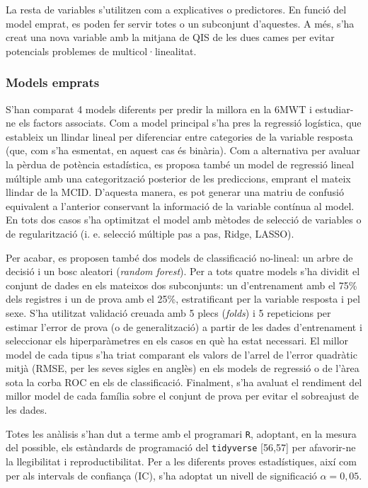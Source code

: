 \documentclass[CAT]{TFUOC}%
\begin{document}
La resta de variables s'utilitzen com a explicatives o predictores. En funció del model emprat, es poden fer servir totes o un subconjunt d'aquestes. A més, s'ha creat una nova variable amb la mitjana de QIS de les dues cames per evitar potencials problemes de multicol·linealitat.

\subsubsection{Models emprats}\label{models-emprats}

S'han comparat 4 models diferents per predir la millora en la 6MWT i estudiar-ne els factors associats. Com a model principal s'ha pres la regressió logística, que estableix un llindar lineal per diferenciar entre categories de la variable resposta (que, com s'ha esmentat, en aquest cas és binària). Com a alternativa per avaluar la pèrdua de potència estadística, es proposa també un model de regressió lineal múltiple amb una categorització posterior de les prediccions, emprant el mateix llindar de la MCID. D'aquesta manera, es pot generar una matriu de confusió equivalent a l'anterior conservant la informació de la variable contínua al model. En tots dos casos s'ha optimitzat el model amb mètodes de selecció de variables o de regularització (i. e. selecció múltiple pas a pas, Ridge, LASSO).

Per acabar, es proposen també dos models de classificació no-lineal: un arbre de decisió i un bosc aleatori (\emph{random forest}). Per a tots quatre models s'ha dividit el conjunt de dades en els mateixos dos subconjunts: un d'entrenament amb el 75\% dels registres i un de prova amb el 25\%, estratificant per la variable resposta i pel sexe. S'ha utilitzat validació creuada amb 5 plecs (\emph{folds}) i 5 repeticions per estimar l'error de prova (o de generalització) a partir de les dades d'entrenament i seleccionar els hiperparàmetres en els casos en què ha estat necessari. El millor model de cada tipus s'ha triat comparant els valors de l'arrel de l'error quadràtic mitjà (RMSE, per les seves sigles en anglès) en els models de regressió o de l'àrea sota la corba ROC en els de classificació. Finalment, s'ha avaluat el rendiment del millor model de cada família sobre el conjunt de prova per evitar el sobreajust de les dades.

Totes les anàlisis s'han dut a terme amb el programari \texttt{R}, adoptant, en la mesura del possible, els estàndards de programació del \texttt{tidyverse} {[}56,57{]} per afavorir-ne la llegibilitat i reproductibilitat. Per a les diferents proves estadístiques, així com per als intervals de confiança (IC), s'ha adoptat un nivell de significació \(\alpha = 0,05\).
\end{document}
